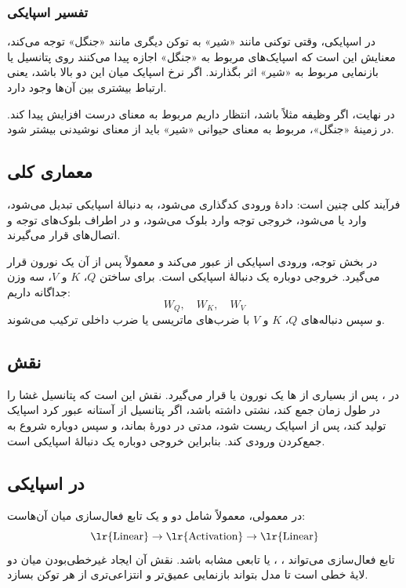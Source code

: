 \subsubsection{تفسیر  اسپایکی}
در  اسپایکی، وقتی توکنی مانند «شیر» به توکن دیگری مانند «جنگل» توجه می‌کند، معنایش این است که اسپایک‌های مربوط به «جنگل» اجازه پیدا می‌کنند روی پتانسیل یا بازنمایی مربوط به «شیر» اثر بگذارند. اگر نرخ اسپایک میان این دو بالا باشد، یعنی ارتباط بیشتری بین آن‌ها وجود دارد.

در نهایت، اگر وظیفه مثلاً  باشد، انتظار داریم  مربوط به معنای درست افزایش پیدا کند. در زمینهٔ «جنگل»،  مربوط به معنای حیوانی «شیر» باید از معنای نوشیدنی بیشتر شود.

\subsection{معماری کلی }
فرآیند کلی  چنین است: دادهٔ ورودی کدگذاری می‌شود، به دنبالهٔ اسپایکی تبدیل می‌شود، وارد  یا  می‌شود، خروجی توجه وارد بلوک  می‌شود، و در اطراف بلوک‌های توجه و  اتصال‌های  قرار می‌گیرند.


در بخش توجه، ورودی اسپایکی از  عبور می‌کند و معمولاً پس از آن یک نورون  قرار می‌گیرد. خروجی  دوباره یک دنبالهٔ اسپایکی است. برای ساختن \(Q\)، \(K\) و \(V\)، سه وزن جداگانه داریم:
\[
W_Q,\quad W_K,\quad W_V
\]
و سپس دنباله‌های \(Q\)، \(K\) و \(V\) با ضرب‌های ماتریسی یا ضرب داخلی ترکیب می‌شوند.

\subsection{نقش }
در ، پس از بسیاری از ها یک نورون  یا  قرار می‌گیرد. نقش  این است که پتانسیل غشا را در طول زمان جمع کند، نشتی داشته باشد، اگر پتانسیل از آستانه عبور کرد اسپایک تولید کند، پس از اسپایک ریست شود، مدتی در دورهٔ  بماند، و سپس دوباره شروع به جمع‌کردن ورودی کند. بنابراین خروجی  دوباره یک دنبالهٔ اسپایکی است.

\subsection{ در  اسپایکی}
در  معمولی،  معمولاً شامل دو  و یک تابع فعال‌سازی میان آن‌هاست:
\[
\text{\lr{Linear}} \rightarrow \text{\lr{Activation}} \rightarrow \text{\lr{Linear}}
\]
تابع فعال‌سازی می‌تواند ، ،  یا تابعی مشابه باشد. نقش آن ایجاد غیرخطی‌بودن میان دو لایهٔ خطی است تا مدل بتواند بازنمایی عمیق‌تر و انتزاعی‌تری از هر توکن بسازد.

